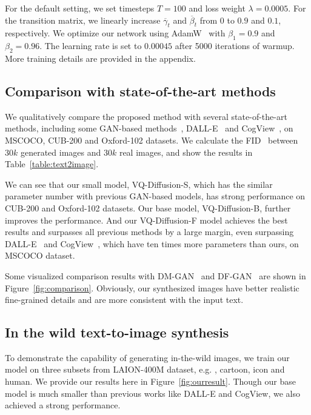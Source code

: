 For the default setting, we set timesteps $T = 100$ and loss weight $\lambda = 0.0005$. For the transition matrix, we linearly increase $\overline\gamma_t$ and $\overline\beta_t$ from $0$ to $0.9$ and $0.1$, respectively. We optimize our network using AdamW~\cite{loshchilov2017decoupled} with $\beta_1=0.9$ and $\beta_2=0.96$. The learning rate is set to $0.00045$ after 5000 iterations of warmup. More training details are provided in the appendix.

\subsection{Comparison with state-of-the-art methods}

We qualitatively compare the proposed method with several state-of-the-art methods, including some GAN-based methods~\cite{xu2018attngan,zhang2017stackgan,souza2020efficient,tan2019semantics,zhang2018stackgan++,zhu2019dm,tao2020df}, DALL-E~\cite{ramesh2021zero} and CogView~\cite{ding2021cogview}, on MSCOCO, CUB-200 and Oxford-102 datasets. We calculate the FID~\cite{heusel2017gans} between $30k$ generated images and $30k$ real images, and show the results in Table~\ref{table:text2image}.

We can see that our small model, VQ-Diffusion-S, which has the similar parameter number with previous GAN-based models, has strong performance on CUB-200 and Oxford-102 datasets. Our base model, VQ-Diffusion-B, further improves the performance. And our VQ-Diffusion-F model achieves the best results and surpasses all previous methods by a large margin, even surpassing DALL-E~\cite{ramesh2021zero} and CogView~\cite{ding2021cogview}, which have ten times more parameters than ours, on MSCOCO dataset.

Some visualized comparison results with DM-GAN~\cite{zhu2019dm} and DF-GAN~\cite{tao2020df} are shown in Figure~\ref{fig:comparison}. Obviously, our synthesized images have better realistic fine-grained details and are more consistent with the input text.

\subsection{In the wild text-to-image synthesis} To demonstrate the capability of generating in-the-wild images, we train our model on three subsets from LAION-400M dataset, e.g. , cartoon, icon and human. We provide our results here in Figure~\ref{fig:ourresult}. Though our base model is much smaller than previous works like DALL-E and CogView, we also achieved a strong performance.

